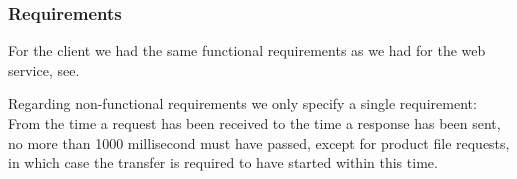 \subsubsection{Requirements}
For the client we had the same functional requirements as we had for the web service, see.

Regarding non-functional requirements we only specify a single requirement: From the time a request has been received to the time a response has been sent, no more than 1000 millisecond must have passed, except for product file requests, in which case the transfer is required to have started within this time.